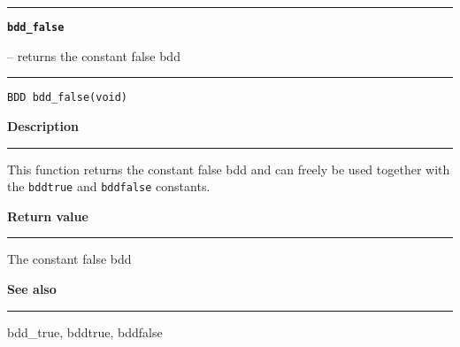 \begin{minipage}{\textwidth}

\noindent\begin{minipage}{\textwidth}
\rule{\textwidth}{0.5mm}
{\tt\bf bdd\_false }
\--- returns the constant false bdd  \hspace{\fill}
\\\rule[1.5ex]{\textwidth}{0.5mm}
\end{minipage}

\noindent\begin{verbatim}
BDD bdd_false(void) 
\end{verbatim}

\vspace{\parsep}\noindent
{\bf Description}\\\rule[1.5ex]{\textwidth}{0.2mm}\vspace{-1.5ex}\setlength{\parindent}{1em}
This function returns the constant false bdd and can freely be
           used together with the {\tt bddtrue} and {\tt bddfalse}
	   constants. 

\setlength{\parindent}{0em}\vspace{\parsep}\vspace{\baselineskip}\noindent
{\bf Return value}\\\rule[1.5ex]{\textwidth}{0.2mm}\vspace{-1.5ex}
The constant false bdd 

\vspace{\parsep}\vspace{\baselineskip}\noindent
{\bf See also}\\\rule[1.5ex]{\textwidth}{0.2mm}\vspace{-1.5ex}
bdd\_true, bddtrue, bddfalse 
\end{minipage}
\vspace{8ex}
